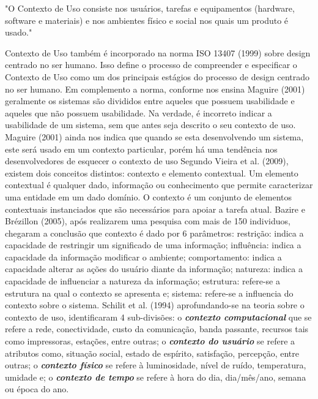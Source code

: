 {\raggedleft
	\hspace*{4.5cm} 
	\begin{minipage}{0.7\textwidth} 
		"O Contexto de Uso consiste nos usuários, tarefas e equipamentos (hardware, software e materiais) e nos ambientes físico e social nos quais um produto é usado."	
		\newline	
	\end{minipage}
	\newline	
	\par}

\indent Contexto de Uso também é incorporado na norma ISO 13407 (1999) sobre design centrado no ser humano. Isso define o processo de compreender e especificar o Contexto de Uso como um dos principais estágios do processo de design centrado no ser humano.\newline
\indent Em complemento a norma, conforme nos ensina Maguire (2001) geralmente os sistemas são divididos entre aqueles que possuem usabilidade e aqueles que não possuem usabilidade. Na verdade, é incorreto indicar a usabilidade de um sistema, sem que antes seja descrito o seu contexto de uso.  Maguire (2001) ainda nos  indica que quando se esta desenvolvendo um sistema, este será usado em um contexto particular, porém há uma tendência nos desenvolvedores de esquecer o contexto de uso\newline
\indent Segundo Vieira et al. (2009), existem dois conceitos distintos: contexto e elemento contextual. Um elemento contextual é qualquer dado, informação ou conhecimento que permite caracterizar uma entidade em um dado domínio. O contexto é um conjunto de elementos contextuais instanciados que são necessários para apoiar a tarefa atual.\newline
\indent Bazire e Brézillon (2005), após realizarem uma pesquisa com mais de 150 individuos, chegaram a conclusão que contexto é dado por  6 parâmetros: restrição: indica a capacidade de restringir um significado de uma informação; influência: indica a capacidade da informação modificar o ambiente; comportamento: indica a capacidade alterar as ações do usuário diante da informação; natureza: indica a capacidade de influenciar a natureza da informação; estrutura: refere-se a estrutura na qual o contexto se apresenta e; sistema: refere-se a influencia do contexto sobre o sistema.\newline
\indent Schilit et al. (1994) aprofundando-se na teoria sobre o contexto de uso, identificaram 4 sub-divisões: o \textit{\textbf{contexto computacional}} que se refere a rede, conectividade, custo da comunicação, banda passante, recursos tais como impressoras, estações, entre outras; o \textit{\textbf{contexto do usuário}} se refere a atributos como, situação social, estado de espírito, satisfação, percepção, entre outras; o \textit{\textbf{contexto físico}} se refere à luminosidade, nível de ruído, temperatura, umidade e; o \textit{\textbf{contexto de tempo}} se refere à hora do dia, dia/mês/ano, semana ou época do ano.\newline
